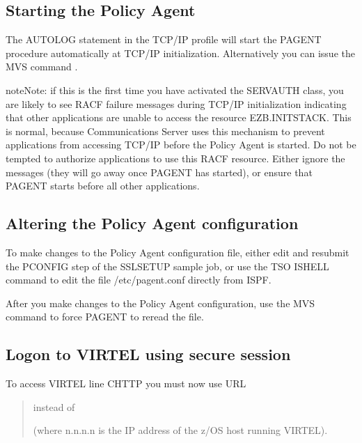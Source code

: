 \documentclass[letterpaper,10pt,english]{sphinxmanual}
\begin{document}
\subsection{Starting the Policy Agent}
\label{\detokenize{connectivity_guide:starting-the-policy-agent}}
\sphinxAtStartPar
The AUTOLOG statement in the TCP/IP profile will start the PAGENT procedure automatically at TCP/IP initialization. Alternatively you can issue the MVS command .

\begin{sphinxadmonition}{note}{Note:}
\sphinxAtStartPar
if this is the first time you have activated the SERVAUTH class, you are likely to see RACF failure messages during TCP/IP initialization indicating that other applications are unable to access the resource EZB.INITSTACK. This is normal, because Communications Server uses this mechanism to prevent applications from accessing TCP/IP before the Policy Agent is started. Do not be tempted to authorize applications to use this RACF resource. Either ignore the messages (they will go away once PAGENT has started), or
ensure that PAGENT starts before all other applications.
\end{sphinxadmonition}


\subsection{Altering the Policy Agent configuration}
\label{\detokenize{connectivity_guide:altering-the-policy-agent-configuration}}
\sphinxAtStartPar
To make changes to the Policy Agent configuration file, either edit and resubmit the PCONFIG step of the SSLSETUP sample job, or use the TSO ISHELL command to edit the file /etc/pagent.conf directly from ISPF.

\sphinxAtStartPar
After you make changes to the Policy Agent configuration, use the MVS command  to force PAGENT to reread the file.


\subsection{Logon to VIRTEL using secure session}
\label{\detokenize{connectivity_guide:logon-to-virtel-using-secure-session}}
\sphinxAtStartPar
To access VIRTEL line C\sphinxhyphen{}HTTP you must now use URL
\begin{quote}

\sphinxAtStartPar
{} instead of 

\sphinxAtStartPar
(where n.n.n.n is the IP address of the z/OS host running VIRTEL).
\end{quote}
\end{document}
